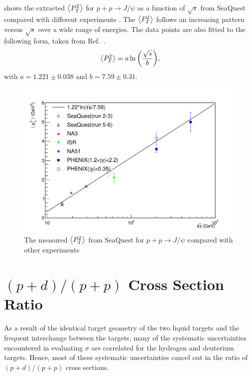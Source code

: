 \documentclass[reprint,aps,unsortedaddress,superscriptaddress,prd,floatfix,showpacs,linenumbers]{revtex4-2}
\begin{document}
 shows the extracted $\expval{P_T^2}$ for $p+p\rightarrow J/\psi$ as a function
of $\sqrt{s}$ from SeaQuest compared with different experiments
\cite{badier1983,clark1978,drapier1998,acharya2020}. The $\expval{P_T^2}$ follows an
increasing pattern versus $\sqrt{s}$ over a wide range of energies.
The data points are also fitted to the following form, taken from Ref.~\cite{acharya2020}.
\begin{equation}
	\expval{P_T^2}=a\ln{\left( \frac{\sqrt{s}}{b} \right)},
\end{equation}
with $a=1.221\pm0.038$ and $b=7.59\pm0.31$.
\begin{figure}
	\centering
	\includegraphics[width=\linewidth]{crossSections/pT/pT_s_release}
	\caption{The measured $\expval{P_T^2}$ from SeaQuest for $p+p\rightarrow J/\psi$ compared with other experiments \cite{clark1978,drapier1998,acharya2020}}
	\label{fig:pt_s}
\end{figure}

\section{$(p+d)/(p+p)$ Cross Section Ratio}
\label{sec:CSR}
As a result of the identical target geometry
of the two liquid targets and the frequent interchange between the targets,
many of the systematic uncertainties encountered in evaluating $\sigma$
are correlated for the hydrogen and deuterium targets. Hence, most of these
systematic uncertainties cancel out in the ratio of $(p+d)/(p+p)$ cross
sections.
\end{document}
